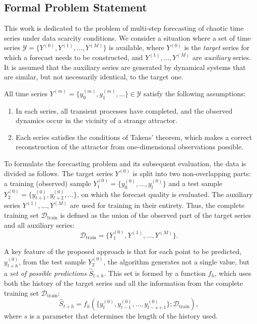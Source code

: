 \documentclass[a4paper,12pt]{extarticle}
\begin{document}
\subsection{Formal Problem Statement}

This work is dedicated to the problem of multi-step forecasting of chaotic
 time series under data scarcity conditions. We consider a situation
  where a set of time series $\mathcal{Y} = \{Y^{(0)}, Y^{(1)},
   \dots, Y^{(M)}\}$ is available, where $Y^{(0)}$ is the \textit{target} series for which
    a forecast needs to be constructed, and $Y^{(1)}, \dots, Y^{(M)}$ are \textit{auxiliary} series.
     It is assumed that the auxiliary series are generated by dynamical systems
      that are similar, but not necessarily identical, to the target one.

All time series $Y^{(m)} = \{y_0^{(m)}, y_1^{(m)}, \dots\} \in \mathcal{Y}$ satisfy the following assumptions:
\begin{enumerate}
    \item In each series, all transient processes have completed, and the observed
    dynamics occur in the vicinity of a strange attractor.
    \item Each series satisfies the conditions of Takens' theorem\cite{Takens1981}, which makes
    a correct reconstruction of the attractor from one-dimensional observations possible.
\end{enumerate}

To formulate the forecasting problem and its subsequent evaluation, the data is divided
 as follows. The target series $Y^{(0)}$ is split into two non-overlapping parts:
  a training (observed) sample $Y_1^{(0)} = \{y_0^{(0)}, \dots, y_t^{(0)}\}$ and
   a test sample $Y_2^{(0)} = \{y_{t+1}^{(0)}, y_{t+2}^{(0)}, \dots\}$, on which
    the forecast quality is evaluated. The auxiliary series $Y^{(1)}, \dots, Y^{(M)}$
     are used for training in their entirety. Thus, the complete training set
     $\mathcal{D}_{\text{train}}$ is defined as the union of the observed part of
      the target series and all auxiliary series:
\[
\mathcal{D}_{\text{train}} = \{Y_1^{(0)}, Y^{(1)}, \dots, Y^{(M)}\}.
\]

A key feature of the proposed approach is that for each
 point to be predicted, $y_{t+h}^{(0)}$, from the test sample $Y_2^{(0)}$, the algorithm
  generates not a single value, but a \textit{set of possible predictions}
   $\hat{S}_{t+h}$. This set is formed by a function $f_h$, which uses
   both the history of the target series and all the information from the complete training set $\mathcal{D}_{\text{train}}$:
\[
\hat{S}_{t+h} = f_h\left(\{y_t^{(0)}, y_{t-1}^{(0)}, \dots, y_{t-s+1}^{(0)}\}; \mathcal{D}_{\text{train}}\right),
\]
where $s$ is a parameter that determines the length of the history used.
\end{document}
